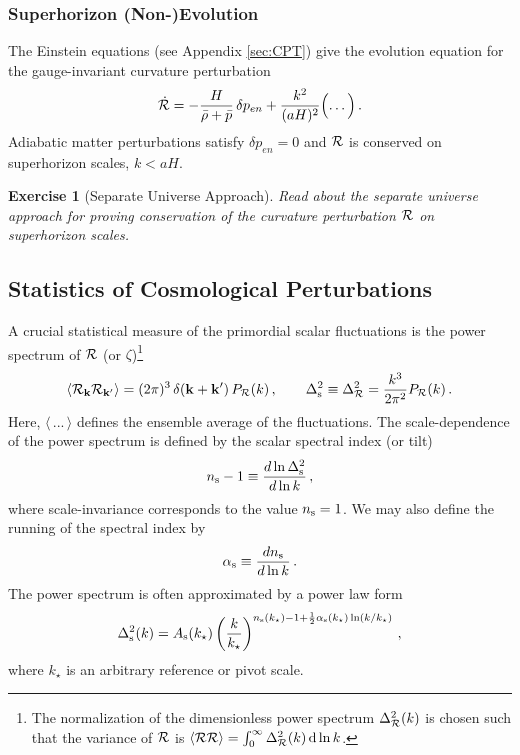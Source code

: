 \documentclass[12pt,letterpaper,rotate]{article}
\def\beq{\begin{equation}}
\def\eeq{\end{equation}}
\def\d{{\rm d}}
\def\R{{\cal R}}
\newtheorem{thm}{Exercise}
\begin{document}
{\subsubsection{Superhorizon (Non-)Evolution}


The Einstein equations (see Appendix \ref{sec:CPT}) give the evolution equation for the gauge-invariant curvature perturbation
\beq
\dot \R = -  \frac{H}{\bar \rho + \bar p}\, \delta p_{en} + \frac{k^2}{(aH)^2} \Bigl(\dots \Bigr)\, .
\eeq
Adiabatic matter perturbations satisfy $\delta p_{en} =0$ and $\R$ is conserved on superhorizon scales, $k < aH$.

\begin{thm}[Separate Universe Approach]
Read about the separate universe approach \cite{Wands:2000dp} for proving conservation of the curvature perturbation $\R$ on superhorizon scales.
\label{ex:separate}
\end{thm}


\subsection{Statistics of Cosmological Perturbations}


A crucial
statistical measure of the primordial scalar fluctuations is the power spectrum of $\R$ (or $\zeta$)\footnote{The
normalization of the dimensionless power spectrum $\Delta_\R^2(k)$ is chosen such that the variance of $\R$ is
$\langle \R \R \rangle = \int_0^\infty \Delta_\R^2(k) \, \d \ln k$. }
\beq \langle \R_{\bf k} \R_{{\bf k}'}
\rangle = (2\pi)^3 \, \delta({\bf k} + {\bf k}') \, P_\R(k)\, , \qquad \Delta_{\rm s}^2 \equiv \Delta_\R^2 = \frac{k^3}{2\pi^2} P_\R(k)\, .  \eeq
Here, $\langle \, ...\, \rangle$ defines the ensemble average of the fluctuations.
The scale-dependence of the power spectrum is defined by the scalar spectral index (or tilt) \beq
\label{equ:ns}
n_{\rm s} - 1 \equiv \frac{d
\ln \Delta^2_{\rm s}}{d \ln k}\, ,\eeq
where scale-invariance corresponds to the value $n_{\rm s} = 1$. We may also define the running of
the spectral index by \beq \label{equ:as}
 \alpha_{\rm s}
\equiv \frac{d n_{\rm s}}{d \ln k}\, . \eeq
The power spectrum is often approximated by a power law form
\beq
\Delta_{\rm s}^2(k) = A_{\rm s}(k_\star) \left(\frac{k}{k_\star}\right)^{n_{\rm s}(k_\star)-1+ \frac{1}{2} \alpha_{\rm s}(k_\star) \ln (k/k_\star)}\, ,
\eeq
where $k_\star$ is an arbitrary reference or pivot scale.

}
\end{document}
